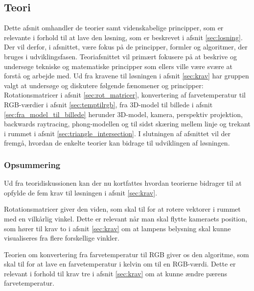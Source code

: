 \subsection{Teori}
\label{sec:teori}

Dette afsnit omhandler de teorier samt videnskabelige principper, som er relevante i forhold til at lave den løsning, som er beskrevet i afsnit \ref{sec:losning}. Der vil derfor, i afsnittet, være fokus på de principper, formler og algoritmer, der bruges i udviklingsfasen. Teoriafsnittet vil primært fokusere på at beskrive og undersøge tekniske og matematiske principper som ellers ville være svære at forstå og arbejde med. Ud fra kravene til løsningen i afsnit \ref{sec:krav} har gruppen valgt at undersøge og diskutere følgende fænomener og principper: Rotationsmatricer i afsnit \ref{sec:rot_matricer}, konvertering af farvetemperatur til RGB-værdier i afsnit \ref{sec:temptilrgb}, fra 3D-model til billede i afsnit \ref{sec:fra_model_til_billede} herunder 3D-model, kamera, perspektiv projektion, backwards raytracing, phong-modellen og til sidst skæring mellem linje og trekant i rummet i afsnit \ref{sec:triangle_intersection}. I slutningen af afsnittet vil der fremgå, hvordan de enkelte teorier kan bidrage til udviklingen af løsningen.











\subsubsection*{Opsummering}

Ud fra teoridiskussionen kan der nu kortfattes hvordan teorierne bidrager til at opfylde de fem krav til løsningen i afsnit \ref{sec:krav}. 

Rotationsmatricer giver den viden, som skal til for at rotere vektorer i rummet med en vilkårlig vinkel. Dette er relevant når man skal flytte kameraets position, som hører til krav to i afsnit \ref{sec:krav} om at lampens belysning skal kunne visualiseres fra flere forskellige vinkler.

Teorien om konvertering fra farvetemperatur til RGB giver os den algoritme, som skal til for at lave en farvetemperatur i kelvin om til en RGB-værdi. Dette er relevant i forhold til krav tre i afsnit \ref{sec:krav} om at kunne ændre pærens farvetemperatur. 

